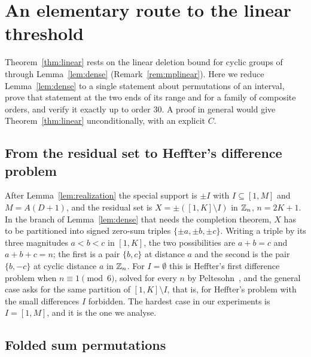 \section{An elementary route to the linear threshold}\label{sec:linearroute}

Theorem~\ref{thm:linear} rests on the linear deletion bound for cyclic groups
of \cite{MuyesserPokrovskiy2025} through Lemma~\ref{lem:dense}
(Remark~\ref{rem:mplinear}).  Here we reduce
Lemma~\ref{lem:dense} to a single statement about permutations of an interval,
prove that statement at the two ends of its range and for a family of composite
orders, and verify it exactly up to order $30$.  A proof in general would give
Theorem~\ref{thm:linear} unconditionally, with an explicit $C$.

\subsection{From the residual set to Heffter's difference problem}

After Lemma~\ref{lem:realization} the special support is $\pm I$ with
$I\subseteq[1,M]$ and $M=A(D+1)$, and the residual set is
$X=\pm([1,K]\setminus I)$ in $\mathbb{Z}_n$, $n=2K+1$.  In the branch of
Lemma~\ref{lem:dense} that needs the completion theorem, $X$ has to be
partitioned into signed zero-sum triples $\{\pm a,\pm b,\pm c\}$.  Writing a
triple by its three magnitudes $a<b<c$ in $[1,K]$, the two possibilities are
$a+b=c$ and $a+b+c=n$; the first is a pair $\{b,c\}$ at distance $a$ and the
second is the pair $\{b,-c\}$ at cyclic distance $a$ in $\mathbb{Z}_n$.  For
$I=\emptyset$ this is Heffter's first difference problem when $n\equiv1\pmod
6$, solved for every $n$ by Peltesohn~\cite{Peltesohn}, and the general case
asks for the same partition of $[1,K]\setminus I$, that is, for Heffter's
problem with the small differences $I$ forbidden.  The hardest case in our experiments is
$I=[1,M]$, and it is the one we analyse.

\subsection{Folded sum permutations}

